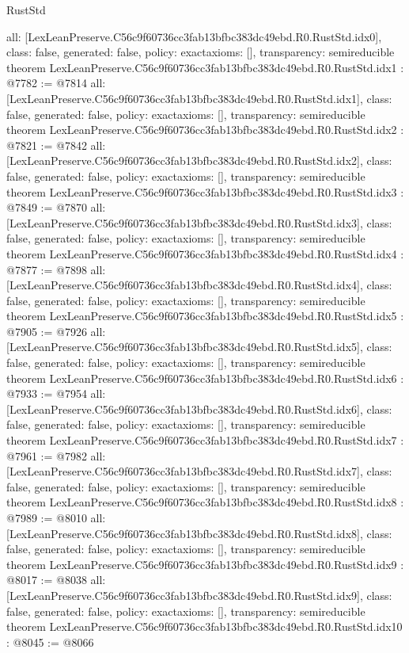 \begin{lexlean}{RustStd}
\begin{coremodule}
{  all: [LexLeanPreserve.C56c9f60736cc3fab13bfbc383dc49ebd.R0.RustStd.idx0],
  class: false,
  generated: false,
  policy: exact{axioms: []},
  transparency: semireducible
}
theorem LexLeanPreserve.C56c9f60736cc3fab13bfbc383dc49ebd.R0.RustStd.idx1 : @7782 := @7814 {
  all: [LexLeanPreserve.C56c9f60736cc3fab13bfbc383dc49ebd.R0.RustStd.idx1],
  class: false,
  generated: false,
  policy: exact{axioms: []},
  transparency: semireducible
}
theorem LexLeanPreserve.C56c9f60736cc3fab13bfbc383dc49ebd.R0.RustStd.idx2 : @7821 := @7842 {
  all: [LexLeanPreserve.C56c9f60736cc3fab13bfbc383dc49ebd.R0.RustStd.idx2],
  class: false,
  generated: false,
  policy: exact{axioms: []},
  transparency: semireducible
}
theorem LexLeanPreserve.C56c9f60736cc3fab13bfbc383dc49ebd.R0.RustStd.idx3 : @7849 := @7870 {
  all: [LexLeanPreserve.C56c9f60736cc3fab13bfbc383dc49ebd.R0.RustStd.idx3],
  class: false,
  generated: false,
  policy: exact{axioms: []},
  transparency: semireducible
}
theorem LexLeanPreserve.C56c9f60736cc3fab13bfbc383dc49ebd.R0.RustStd.idx4 : @7877 := @7898 {
  all: [LexLeanPreserve.C56c9f60736cc3fab13bfbc383dc49ebd.R0.RustStd.idx4],
  class: false,
  generated: false,
  policy: exact{axioms: []},
  transparency: semireducible
}
theorem LexLeanPreserve.C56c9f60736cc3fab13bfbc383dc49ebd.R0.RustStd.idx5 : @7905 := @7926 {
  all: [LexLeanPreserve.C56c9f60736cc3fab13bfbc383dc49ebd.R0.RustStd.idx5],
  class: false,
  generated: false,
  policy: exact{axioms: []},
  transparency: semireducible
}
theorem LexLeanPreserve.C56c9f60736cc3fab13bfbc383dc49ebd.R0.RustStd.idx6 : @7933 := @7954 {
  all: [LexLeanPreserve.C56c9f60736cc3fab13bfbc383dc49ebd.R0.RustStd.idx6],
  class: false,
  generated: false,
  policy: exact{axioms: []},
  transparency: semireducible
}
theorem LexLeanPreserve.C56c9f60736cc3fab13bfbc383dc49ebd.R0.RustStd.idx7 : @7961 := @7982 {
  all: [LexLeanPreserve.C56c9f60736cc3fab13bfbc383dc49ebd.R0.RustStd.idx7],
  class: false,
  generated: false,
  policy: exact{axioms: []},
  transparency: semireducible
}
theorem LexLeanPreserve.C56c9f60736cc3fab13bfbc383dc49ebd.R0.RustStd.idx8 : @7989 := @8010 {
  all: [LexLeanPreserve.C56c9f60736cc3fab13bfbc383dc49ebd.R0.RustStd.idx8],
  class: false,
  generated: false,
  policy: exact{axioms: []},
  transparency: semireducible
}
theorem LexLeanPreserve.C56c9f60736cc3fab13bfbc383dc49ebd.R0.RustStd.idx9 : @8017 := @8038 {
  all: [LexLeanPreserve.C56c9f60736cc3fab13bfbc383dc49ebd.R0.RustStd.idx9],
  class: false,
  generated: false,
  policy: exact{axioms: []},
  transparency: semireducible
}
theorem LexLeanPreserve.C56c9f60736cc3fab13bfbc383dc49ebd.R0.RustStd.idx10 : @8045 := @8066 {
}
\end{coremodule}
\end{lexlean}
